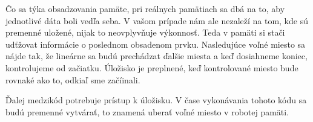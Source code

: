 Čo sa týka obsadzovania pamäte, pri reálnych pamätiach sa dbá na to, aby jednotlivé dáta boli vedľa seba. 
V vašom prípade nám ale nezaleží na tom, kde sú premenné uložené, nijak to neovplyvňuje výkonnosť. Teda v pamäti si stači udťžovat informácie o poslednom obsadenom prvku. Nasledujúce voľné miesto sa nájde tak, že lineárne sa budú prechádzat ďalšie miesta a keď dosiahneme koniec, kontrolujeme od začiatku. Úložisko je preplnené, keď kontrolované miesto bude rovnaké ako to, odkiaľ sme začíinali.

Ďalej medzikód potrebuje prístup k úložisku. V čase vykonávania tohoto kódu sa budú premenné vytvárať, to znamená uberať voľné miesto v robotej pamäti. \\

